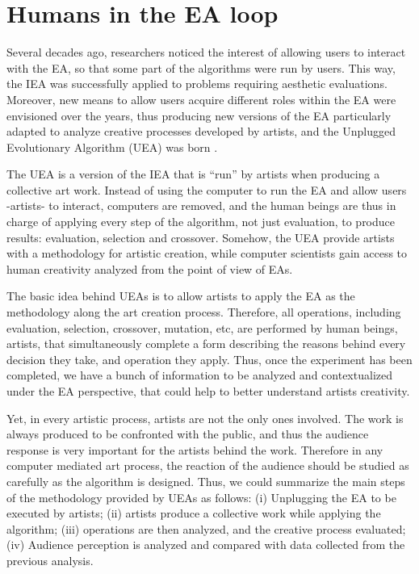 \documentclass[graybox]{svmult}
\begin{document}
\section{Humans in the EA loop}
\label{loop}
Several decades ago, researchers noticed the interest of allowing
users to interact with the EA, so that some part of the algorithms
were run by users.  This way, the IEA was successfully applied to
problems requiring aesthetic evaluations.  Moreover, new means to
allow users acquire different roles within the EA were envisioned over
the years, thus producing new versions of the EA particularly adapted
to analyze creative processes developed by artists, and the Unplugged
Evolutionary Algorithm (UEA) was born \cite{de2013unplugging}. 

The UEA is a version of the IEA that is ``run'' by artists when
producing a collective art work.  Instead of using the computer to run
the EA and allow users -artists- to interact, computers are removed,
and the human beings are thus in charge of applying every step of the
algorithm, not just evaluation, to produce results:  evaluation,
selection and crossover.  Somehow, the UEA provide artists with a
methodology for artistic creation, while computer scientists gain
access to human creativity analyzed from the point of view of EAs.

The basic idea behind UEAs is to allow artists to apply the EA as the methodology along the art creation process.  Therefore, all operations, including evaluation, selection, crossover, mutation, etc, are performed by human beings, artists, that simultaneously complete a form describing the reasons behind every decision they take, and operation they apply. Thus, once the experiment has been completed, we have a bunch of information to be analyzed and contextualized under the EA perspective, that could help to better understand artists creativity.

Yet, in every artistic process, artists are not the only ones involved.  The work is always produced to be confronted with the public, and thus the audience response is very important for the artists behind the work. Therefore in any computer mediated art process, the reaction of the audience should be studied as carefully as the algorithm is designed.  Thus, we could summarize the main steps of the methodology provided by UEAs as follows:    (i) Unplugging the EA to be executed by artists; (ii) artists produce a collective work while applying the algorithm;  (iii) operations are then analyzed, and the creative process evaluated;  (iv) Audience perception is analyzed and compared with data collected from the previous analysis.
\end{document}
